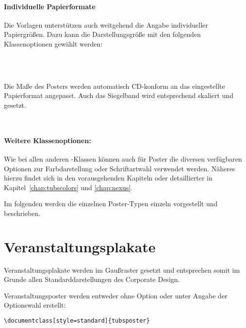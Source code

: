 \paragraph{Individuelle Papierformate}

Die Vorlagen unterstützen auch weitgehend die Angabe individueller Papiergrößen.
Dazu kann die Darstellungsgröße mit den folgenden Klassenoptionen
gewählt werden:
\begin{Declaration}
\\
\\
\end{Declaration}

Die Maße des Posters werden automatisch CD-konform an das eingestellte
Papierformat angepasst.
Auch das Siegelband wird entsprechend skaliert und gesetzt. 

\begin{Declaration}
  \\
\end{Declaration}


\paragraph{Weitere Klassenoptionen:}

Wie bei allen anderen \tubslatex-Klassen können auch für Poster
die diversen verfügbaren Optionen zur Farbdarstellung oder Schriftartwahl
verwendet werden.
Näheres hierzu findet sich in den vorausgehenden Kapiteln oder detaillierter
in Kapitel~\ref{chap:tubscolors} und \ref{chap:nexus}.
\bigskip

Im folgenden werden die einzelnen Poster-Typen einzeln vorgestellt und beschrieben.

\clearpage
\section{Veranstaltungsplakate}

Veranstaltungsplakate werden im Gaußraster gesetzt und entsprechen somit
im Grunde allen Standarddarstellungen des Corporate Design.

Veranstaltungsposter werden entweder ohne Option oder
unter Angabe der Optionswahl  erstellt:
\begin{lstlisting}
\documentclass[style=standard]{tubsposter}
\end{lstlisting}

